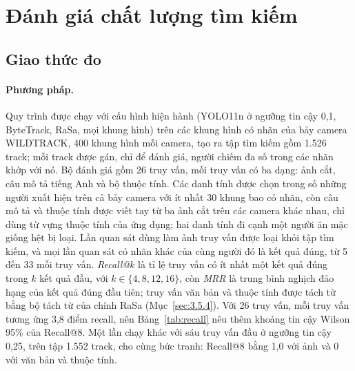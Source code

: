 \section{Đánh giá chất lượng tìm kiếm}
\label{sec:8.4}

\subsection{Giao thức đo}

\paragraph{Phương pháp.} Quy trình được chạy với cấu hình hiện hành (YOLO11n ở ngưỡng tin cậy 0,1, ByteTrack, RaSa, mọi khung hình) trên các khung hình có nhãn của bảy camera WILDTRACK, 400 khung hình mỗi camera, tạo ra tập tìm kiếm gồm 1.526 track; mỗi track được gán, chỉ để đánh giá, người chiếm đa số trong các nhãn khớp với nó. Bộ đánh giá gồm 26 truy vấn, mỗi truy vấn có ba dạng: ảnh cắt, câu mô tả tiếng Anh và bộ thuộc tính. Các danh tính được chọn trong số những người xuất hiện trên cả bảy camera với ít nhất 30 khung bao có nhãn, còn câu mô tả và thuộc tính được viết tay từ ba ảnh cắt trên các camera khác nhau, chỉ dùng từ vựng thuộc tính của ứng dụng; hai danh tính đi cạnh một người ăn mặc giống hệt bị loại. Lần quan sát dùng làm ảnh truy vấn được loại khỏi tập tìm kiếm, và mọi lần quan sát có nhãn khác của cùng người đó là kết quả đúng, từ 5 đến 33 mỗi truy vấn. \emph{Recall@$k$} là tỉ lệ truy vấn có ít nhất một kết quả đúng trong $k$ kết quả đầu, với $k \in \{4, 8, 12, 16\}$, còn \emph{MRR} là trung bình nghịch đảo hạng của kết quả đúng đầu tiên; truy vấn văn bản và thuộc tính được tách từ bằng bộ tách từ của chính RaSa (Mục~\ref{sec:3.5.4}). Với 26 truy vấn, mỗi truy vấn tương ứng 3,8 điểm recall, nên Bảng~\ref{tab:recall} nêu thêm khoảng tin cậy Wilson 95\% của Recall@8. Một lần chạy khác với sáu truy vấn đầu ở ngưỡng tin cậy 0,25, trên tập 1.552 track, cho cùng bức tranh: Recall@8 bằng 1,0 với ảnh và 0 với văn bản và thuộc tính.

